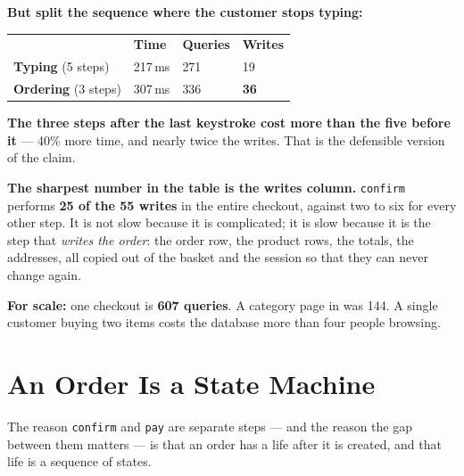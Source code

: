 \begin{measured}
\smallskip
\textbf{But split the sequence where the customer stops typing:}

\smallskip
\begin{tabular}{@{}L{5.2cm}L{2.6cm}L{2.6cm}L{2.6cm}@{}}
& \textbf{Time} & \textbf{Queries} & \textbf{Writes} \\
\textbf{Typing} (5 steps) & 217\,ms & 271 & 19 \\
\textbf{Ordering} (3 steps) & 307\,ms & 336 & \textbf{36} \\
\end{tabular}

\smallskip
\textbf{The three steps after the last keystroke cost more than the five before
it} --- 40\% more time, and nearly twice the writes. That is the defensible
version of the claim.

\smallskip
\textbf{The sharpest number in the table is the writes column.}
\texttt{confirm} performs \textbf{25 of the 55 writes} in the entire checkout,
against two to six for every other step. It is not slow because it is
complicated; it is slow because it is the step that \emph{writes the order}:
the order row, the product rows, the totals, the addresses, all copied out of
the basket and the session so that they can never change again.

\smallskip
\textbf{For scale:} one checkout is \textbf{607 queries}. A category page in
 was 144. A single customer buying two items costs the
database more than four people browsing.
\end{measured}

\section{An Order Is a State Machine}

The reason \texttt{confirm} and \texttt{pay} are separate steps --- and the
reason the gap between them matters --- is that an order has a life after it is
created, and that life is a sequence of states.

